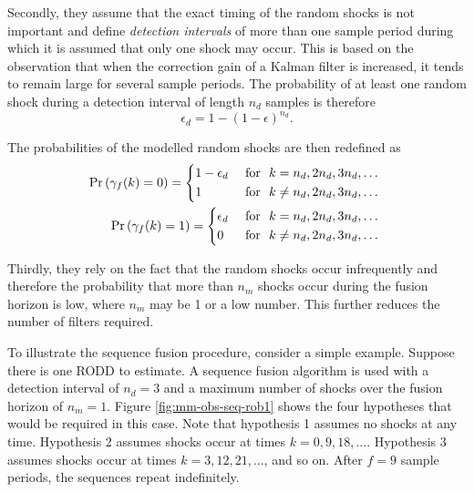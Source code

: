 Secondly, they assume that the exact timing of the random shocks is not important and define \textit{detection intervals} of more than one sample period during which it is assumed that only one shock may occur. This is based on the observation that when the correction gain of a Kalman filter is increased, it tends to remain large for several sample periods. The probability of at least one random shock during a detection interval of length $n_d$ samples is therefore
\begin{equation} \label{eq:p_gamma_d}
	\epsilon_d = 1 - (1 - \epsilon)^{n_d}.
\end{equation}

The probabilities of the modelled random shocks are then redefined as
\begin{equation} \label{eq:Pr_gamma_nd}
	\begin{aligned}
		\Pr\left(\gamma_{f}(k)=0\right) = \begin{cases*}
			1 - \epsilon_d & \text { for } $k = n_d, 2n_d, 3n_d, \ldots$ \\
			1 & \text { for } $k \ne n_d, 2n_d, 3n_d, \ldots$
		\end{cases*} \\
		\Pr\left(\gamma_{f}(k)=1\right) = \begin{cases*}
			\epsilon_d & \text { for } $k = n_d, 2n_d, 3n_d, \ldots$ \\
			0 & \text { for } $k \ne n_d, 2n_d, 3n_d, \ldots$
		\end{cases*} \\
	\end{aligned}
\end{equation}

Thirdly, they rely on the fact that the random shocks occur infrequently and therefore the probability that more than $n_m$ shocks occur during the fusion horizon is low, where $n_m$ may be 1 or a low number. This further reduces the number of filters required.

To illustrate the sequence fusion procedure, consider a simple example. Suppose there is one RODD to estimate. A sequence fusion algorithm is used with a detection interval of $n_d=3$ and a maximum number of shocks over the fusion horizon of $n_m=1$. Figure \ref{fig:mm-obs-seq-rob1} shows the four hypotheses that would be required in this case. Note that hypothesis 1 assumes no shocks at any time. Hypothesis 2 assumes shocks occur at times $k=0,9,18,...$. Hypothesis 3 assumes shocks occur at times $k=3,12,21,...$, and so on. After $f=9$ sample periods, the sequences repeat indefinitely.

